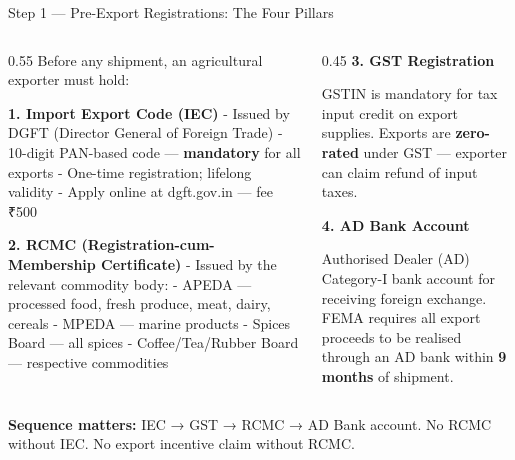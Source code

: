 \documentclass[
  ignorenonframetext,
  aspectratio=169,
]{beamer}
\makeatletter
\let\quarto@originallabel\label
\DeclareRobustCommand*{\label}[1]{\quarto@originallabel{#1}}
\makeatother
\begin{document}
\begin{frame}
\begin{block}{Step 1 --- Pre-Export Registrations: The Four Pillars}
\label{step-1-pre-export-registrations-the-four-pillars}
\begin{columns}[T]
\begin{column}{0.55\linewidth}
Before any shipment, an agricultural exporter must hold:

\textbf{1. Import Export Code (IEC)} - Issued by DGFT (Director General
of Foreign Trade) - 10-digit PAN-based code --- \textbf{mandatory} for
all exports - One-time registration; lifelong validity - Apply online at
dgft.gov.in --- fee ₹500

\textbf{2. RCMC (Registration-cum-Membership Certificate)} - Issued by
the relevant commodity body: - {APEDA} --- processed food, fresh
produce, meat, dairy, cereals - {MPEDA} --- marine products - {Spices
Board} --- all spices - {Coffee/Tea/Rubber Board} --- respective
commodities
\end{column}

\begin{column}{0.45\linewidth}
\textbf{3. GST Registration}

GSTIN is mandatory for tax input credit on export supplies. Exports are
\textbf{zero-rated} under GST --- exporter can claim refund of input
taxes.

\textbf{4. AD Bank Account}

Authorised Dealer (AD) Category-I bank account for receiving foreign
exchange. FEMA requires all export proceeds to be realised through an AD
bank within \textbf{9 months} of shipment.
\end{column}
\end{columns}

\textbf{Sequence matters:} IEC → GST → RCMC → AD Bank account. No RCMC
without IEC. No export incentive claim without RCMC.
\end{block}
\end{frame}
\end{document}
